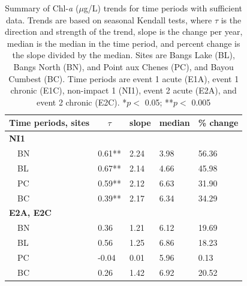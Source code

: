 \documentclass[letterpaper,12pt]{article}\usepackage[]{graphicx}\usepackage[]{color}
\begin{document}
\begin{table}[!tbp]
\caption{Summary of Chl-\textit{a} ($\mu$g/L) trends for time periods with sufficient data.  Trends are based on seasonal Kendall tests, where $\tau$ is the direction and strength of the trend, slope is the change per year, median is the median in the time period, and percent change is the slope divided by the median. Sites are Bangs Lake (BL), Bangs North (BN), and Point aux Chenes (PC), and Bayou Cumbest (BC). Time periods are event 1 acute (E1A), event 1 chronic (E1C), non-impact 1 (NI1), event 2 acute (E2A), and event 2 chronic (E2C). *$p <$ 0.05; **$p <$ 0.005\label{tab:CHLA_Ntrnd}} 
\begin{center}
\begin{tabular}{lllll}
\hline\hline
\multicolumn{1}{l}{Time periods, sites}&\multicolumn{1}{c}{$\tau$}&\multicolumn{1}{c}{slope}&\multicolumn{1}{c}{median}&\multicolumn{1}{c}{\% change}\tabularnewline
\hline
{\bfseries NI1}&&&&\tabularnewline
~~BN&0.61**&2.24&3.98&56.36\tabularnewline
~~BL&0.67**&2.14&4.66&45.98\tabularnewline
~~PC&0.59**&2.12&6.63&31.90\tabularnewline
~~BC&0.39**&2.17&6.34&34.29\tabularnewline
\hline
{\bfseries E2A, E2C}&&&&\tabularnewline
~~BN&0.36&1.21&6.12&19.69\tabularnewline
~~BL&0.56&1.25&6.86&18.23\tabularnewline
~~PC&-0.04&0.01&5.96&0.13\tabularnewline
~~BC&0.26&1.42&6.92&20.52\tabularnewline
\hline
\end{tabular}\end{center}
\end{table}
\end{document}
